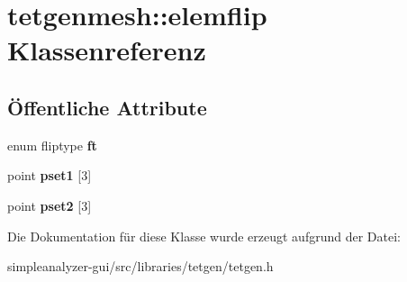 \hypertarget{classtetgenmesh_1_1elemflip}{\section{tetgenmesh\-:\-:elemflip Klassenreferenz}
\label{classtetgenmesh_1_1elemflip}
}
\subsection*{Öffentliche Attribute}
\begin{DoxyCompactItemize}
\item 
\hypertarget{classtetgenmesh_1_1elemflip_a7cff4e7c29485ca9d5348b62ce1cc5f5}{enum fliptype {\bfseries ft}}\label{classtetgenmesh_1_1elemflip_a7cff4e7c29485ca9d5348b62ce1cc5f5}

\item 
\hypertarget{classtetgenmesh_1_1elemflip_a395c999eeefa8daa89fa0a57551aeddb}{point {\bfseries pset1} \mbox{[}3\mbox{]}}\label{classtetgenmesh_1_1elemflip_a395c999eeefa8daa89fa0a57551aeddb}

\item 
\hypertarget{classtetgenmesh_1_1elemflip_aa77e84807d092afee8fa7eacc91407b7}{point {\bfseries pset2} \mbox{[}3\mbox{]}}\label{classtetgenmesh_1_1elemflip_aa77e84807d092afee8fa7eacc91407b7}

\end{DoxyCompactItemize}


Die Dokumentation für diese Klasse wurde erzeugt aufgrund der Datei\-:\begin{DoxyCompactItemize}
\item 
simpleanalyzer-\/gui/src/libraries/tetgen/tetgen.\-h\end{DoxyCompactItemize}

